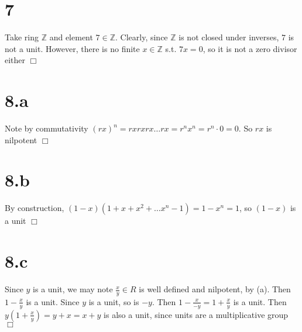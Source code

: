 \documentclass{article}
\begin{document}
\section*{7}
Take ring $\mathbb{Z}$ and element $7 \in \mathbb{Z}$. Clearly, since $\mathbb{Z}$ is not closed under inverses, $7$ is not a unit. However, there is no finite $x \in \mathbb{Z}$ s.t. $7x = 0$, so it is not a zero divisor either $\Box$

\section*{8.a}
Note by commutativity $(rx)^n = rxrxrx\dots rx = r^nx^n = r^n \cdot 0 = 0$. So $rx$ is nilpotent $\Box$
\section*{8.b}
By construction, $(1-x)(1+x+x^2+\dots x^n-1) = 1 - x^n = 1$, so $(1-x)$ is a unit $\Box$
\section*{8.c}
Since $y$ is a unit, we may note $\frac{x}{y} \in R$ is well defined and nilpotent, by (a). Then $1-\frac{x}{y}$ is a unit. Since $y$ is a unit, so is $-y$. Then $1 - \frac{x}{-y} = 1 + \frac{x}{y}$ is a unit. Then $y(1+\frac{x}{y}) = y + x = x + y$ is also a unit, since units are a multiplicative group $\Box$
\end{document}
